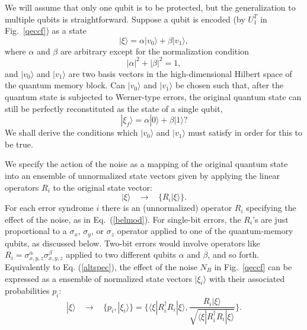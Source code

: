 We will assume that only one qubit is to be protected, but the
generalization to multiple qubits is straightforward.  Suppose a qubit
is encoded (by $U_1^T$ in Fig.~\ref{qeccf}) as a state
\begin{equation}
|\xi\rangle=\alpha|v_0\rangle+\beta|v_1\rangle,\label{Psistart}
\end{equation}
where $\alpha$ and $\beta$ are arbitrary except for the normalization
condition
\begin{equation}
|\alpha|^2+|\beta|^2=1,
\end{equation}
and $|v_0\rangle$ and $|v_1\rangle$ are two basis vectors in the
high-dimensional Hilbert space of the quantum memory block.
Can $|v_0\rangle$ and $|v_1\rangle$
be chosen such that, after the quantum state is subjected to Werner-type
errors,
the original quantum state can still be perfectly
reconstituted as the state of a single qubit,
\begin{equation}
|\xi_f\rangle=\alpha|0\rangle+\beta|1\rangle?\label{final}
\end{equation}
We shall derive the conditions which $|v_0\rangle$ and $|v_1\rangle$
must satisfy in order for this to be true.
 
We specify the action of the noise as a mapping of the original
quantum state into an ensemble of unnormalized state vectors given by
applying the linear operators $R_i$ to the original state vector:
\begin{equation}
|\xi\rangle\ \ \ \ \rightarrow\ \ \ \ \{R_i|\xi\rangle\}.\label{altspec}
\end{equation}
For each error syndrome $i$ there is an (unnormalized)
operator $R_i$ specifying the effect of the noise, as in Eq.~(\ref{belmod}).
For single-bit errors, the
$R_i$'s are just proportional to a $\sigma_x$, $\sigma_y$, or $\sigma_z$
operator applied to one of the quantum-memory qubits, as discussed below.
Two-bit errors would involve operators like
$R_i=\sigma_{x,y,z}^\alpha\sigma_{x,y,z}^\beta$ applied to two different
qubits $\alpha$
and $\beta$, and so forth.  Equivalently to Eq. (\ref{altspec}), the
effect of the noise $N_B$ in Fig.~\ref{qeccf} can be expressed as a
ensemble of normalized state vectors $|\xi_i\rangle$ with their
associated probabilities $p_i$:
\begin{equation}
|\xi\rangle\ \ \ \ \rightarrow\ \ \ \ \{p_i,|\xi_i\rangle \}=
\{ \langle\xi|R_i^\dagger R_i|\xi\rangle,\frac{R_i|\xi\rangle}
{\sqrt{\langle\xi|R_i^\dagger R_i|\xi\rangle}} \} .\label{POVMnorm}
\end{equation}
 
